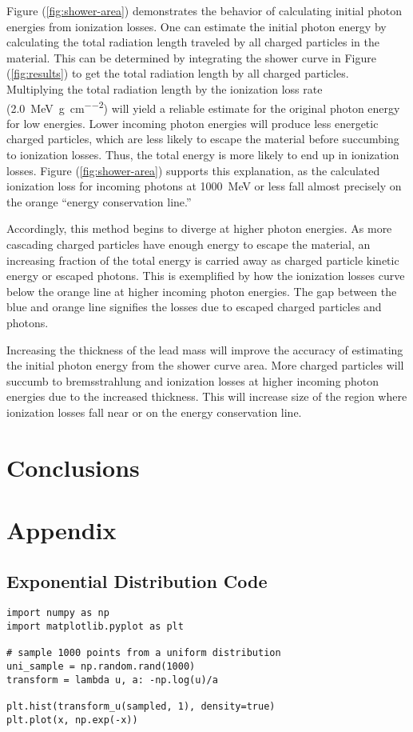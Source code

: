 \documentclass{article}
\newcommand{\radlen}{\gram\per\cm^2}
\begin{document}
Figure (\ref{fig:shower-area}) demonstrates the behavior of calculating initial photon energies from ionization losses. One can estimate the initial photon energy by calculating the total radiation length traveled by all charged particles in the material. This can be determined by integrating the shower curve in Figure (\ref{fig:results}) to get the total radiation length by all charged particles. Multiplying the total radiation length by the ionization loss rate (\SI{2.0}{\MeV\per\radlen}) will yield a reliable estimate for the original photon energy for low energies. Lower incoming photon energies will produce less energetic charged particles, which are less likely to escape the material before succumbing to ionization losses. Thus, the total energy is more likely to end up in ionization losses. Figure (\ref{fig:shower-area}) supports this explanation, as the calculated ionization loss for incoming photons at \SI{1000}{\MeV} or less fall almost precisely on the orange ``energy conservation line.''

Accordingly, this method begins to diverge at higher photon energies. As more cascading charged particles have enough energy to escape the material, an increasing fraction of the total energy is carried away as charged particle kinetic energy or escaped photons. This is exemplified by how the ionization losses curve below the orange line at higher incoming photon energies. The gap between the blue and orange line signifies the losses due to escaped charged particles and photons.

Increasing the thickness of the lead mass will improve the accuracy of estimating the initial photon energy from the shower curve area. More charged particles will succumb to bremsstrahlung and ionization losses at higher incoming photon energies due to the increased thickness. This will increase size of the region where ionization losses fall near or on the energy conservation line.
\section{Conclusions} %
\label{sec:Conclusions}

\section{Appendix} %
\label{sec:Appendix}

\newpage
\subsection{Exponential Distribution Code} %
\label{sub:Exponential Distribution Code}
\begin{verbatim}
import numpy as np
import matplotlib.pyplot as plt

# sample 1000 points from a uniform distribution
uni_sample = np.random.rand(1000)
transform = lambda u, a: -np.log(u)/a

plt.hist(transform_u(sampled, 1), density=true)
plt.plot(x, np.exp(-x))
\end{verbatim}
\end{document}
